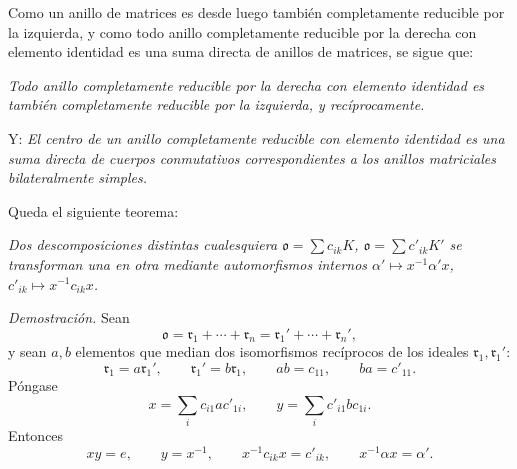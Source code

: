 \documentclass[11pt]{article}
\providecommand{\mo}{\mathfrak{o}}
\providecommand{\mr}{\mathfrak{r}}
\begin{document}
Como un anillo de matrices es desde luego también completamente reducible por la izquierda, y como todo anillo completamente reducible por la derecha con elemento identidad es una suma directa de anillos de matrices, se sigue que:

\emph{Todo anillo completamente reducible por la derecha con elemento identidad es también completamente reducible por la izquierda, y recíprocamente.}

Y: \emph{El centro de un anillo completamente reducible con elemento identidad es una suma directa de cuerpos conmutativos correspondientes a los anillos matriciales bilateralmente simples.}

Queda el siguiente teorema:

\emph{Dos descomposiciones distintas cualesquiera $\mo=\sum c_{ik}K$, $\mo=\sum c'_{ik}K'$ se transforman una en otra mediante automorfismos internos $\alpha'\mapsto x^{-1}\alpha'x$, $c'_{ik}\mapsto x^{-1}c_{ik}x$.}

\emph{Demostración.} Sean
\[
        \mo=\mr_1+\cdots+\mr_n=\mr_1'+\cdots+\mr_n',
\]
y sean $a,b$ elementos que median dos isomorfismos recíprocos de los ideales $\mr_1,\mr_1'$:
\[
        \mr_1=a\mr_1',
        \qquad
        \mr_1'=b\mr_1,
        \qquad
        ab=c_{11},
        \qquad
        ba=c'_{11}.
\]
Póngase
\[
        x=\sum_i c_{i1}ac'_{1i},
        \qquad
        y=\sum_i c'_{i1}bc_{1i}.
\]
Entonces
\[
        xy=e,
        \qquad
        y=x^{-1},
        \qquad
        x^{-1}c_{ik}x=c'_{ik},
        \qquad
        x^{-1}\alpha x=\alpha'.
\]
\end{document}
